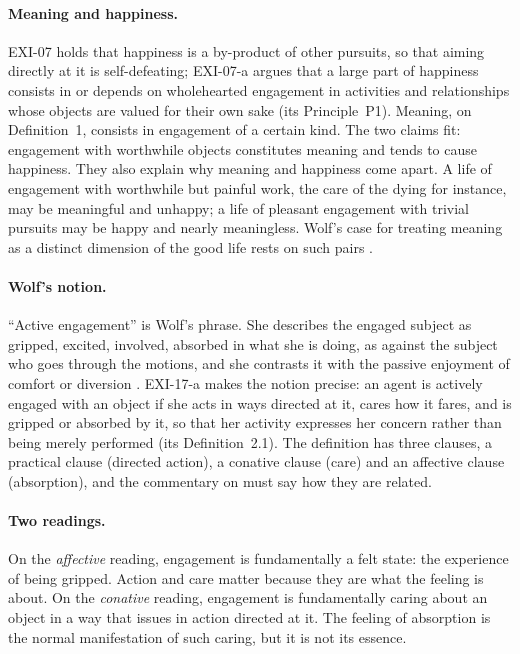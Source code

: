 \paragraph{Meaning and happiness.} EXI-07 holds that happiness is a by-product of other pursuits, so that aiming directly at it is self-defeating; EXI-07-a argues that a large part of happiness consists in or depends on wholehearted engagement in activities and relationships whose objects are valued for their own sake (its Principle~P1). Meaning, on Definition~1, consists in engagement of a certain kind. The two claims fit: engagement with worthwhile objects constitutes meaning and tends to cause happiness. They also explain why meaning and happiness come apart. A life of engagement with worthwhile but painful work, the care of the dying for instance, may be meaningful and unhappy; a life of pleasant engagement with trivial pursuits may be happy and nearly meaningless. Wolf's case for treating meaning as a distinct dimension of the good life rests on such pairs \citep{Wolf1997}.


\paragraph{Wolf's notion.} \enquote{Active engagement} is Wolf's phrase. She describes the engaged subject as gripped, excited, involved, absorbed in what she is doing, as against the subject who goes through the motions, and she contrasts it with the passive enjoyment of comfort or diversion \citep{Wolf2010}. EXI-17-a makes the notion precise: an agent is actively engaged with an object if she acts in ways directed at it, cares how it fares, and is gripped or absorbed by it, so that her activity expresses her concern rather than being merely performed (its Definition~2.1). The definition has three clauses, a practical clause (directed action), a conative clause (care) and an affective clause (absorption), and the commentary on  must say how they are related.

\paragraph{Two readings.} On the \emph{affective} reading, engagement is fundamentally a felt state: the experience of being gripped. Action and care matter because they are what the feeling is about. On the \emph{conative} reading, engagement is fundamentally caring about an object in a way that issues in action directed at it. The feeling of absorption is the normal manifestation of such caring, but it is not its essence.

